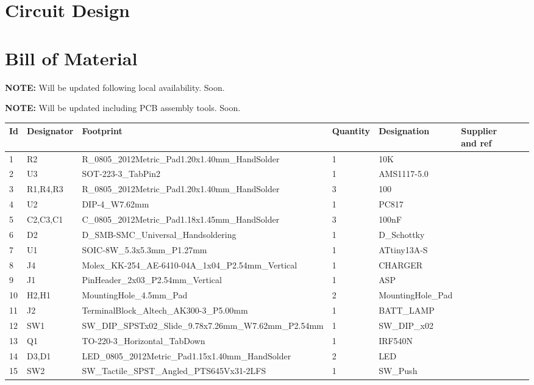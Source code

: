 \documentclass[a4paper,12pt,oneside,pdflatex,italian,final,twocolumn]{article}
\begin{document}
	\section{Circuit Design}
	
	
	
	
	
	\newpage
	\section{Bill of Material}
	
	\textbf{NOTE:} Will be updated following local availability. Soon.
	
	\textbf{NOTE:} Will be updated including PCB assembly tools. Soon.
	
	\begin{table}[!ht]
		\centering
		\begin{tabular}{|l|l|l|l|l|l|l|l|}
			\hline
			Id & Designator & Footprint & Quantity & Designation & Supplier and ref & ~ & ~ \\ \hline
			1 & R2 & R\_0805\_2012Metric\_Pad1.20x1.40mm\_HandSolder & 1 & 10K & ~ & ~ & ~ \\ \hline
			2 & U3 & SOT-223-3\_TabPin2 & 1 & AMS1117-5.0 & ~ & ~ & ~ \\ \hline
			3 & R1,R4,R3 & R\_0805\_2012Metric\_Pad1.20x1.40mm\_HandSolder & 3 & 100 & ~ & ~ & ~ \\ \hline
			4 & U2 & DIP-4\_W7.62mm & 1 & PC817 & ~ & ~ & ~ \\ \hline
			5 & C2,C3,C1 & C\_0805\_2012Metric\_Pad1.18x1.45mm\_HandSolder & 3 & 100nF & ~ & ~ & ~ \\ \hline
			6 & D2 & D\_SMB-SMC\_Universal\_Handsoldering & 1 & D\_Schottky & ~ & ~ & ~ \\ \hline
			7 & U1 & SOIC-8W\_5.3x5.3mm\_P1.27mm & 1 & ATtiny13A-S & ~ & ~ & ~ \\ \hline
			8 & J4 & Molex\_KK-254\_AE-6410-04A\_1x04\_P2.54mm\_Vertical & 1 & CHARGER & ~ & ~ & ~ \\ \hline
			9 & J1 & PinHeader\_2x03\_P2.54mm\_Vertical & 1 & ASP & ~ & ~ & ~ \\ \hline
			10 & H2,H1 & MountingHole\_4.5mm\_Pad & 2 & MountingHole\_Pad & ~ & ~ & ~ \\ \hline
			11 & J2 & TerminalBlock\_Altech\_AK300-3\_P5.00mm & 1 & BATT\_LAMP & ~ & ~ & ~ \\ \hline
			12 & SW1 & SW\_DIP\_SPSTx02\_Slide\_9.78x7.26mm\_W7.62mm\_P2.54mm & 1 & SW\_DIP\_x02 & ~ & ~ & ~ \\ \hline
			13 & Q1 & TO-220-3\_Horizontal\_TabDown & 1 & IRF540N & ~ & ~ & ~ \\ \hline
			14 & D3,D1 & LED\_0805\_2012Metric\_Pad1.15x1.40mm\_HandSolder & 2 & LED & ~ & ~ & ~ \\ \hline
			15 & SW2 & SW\_Tactile\_SPST\_Angled\_PTS645Vx31-2LFS & 1 & SW\_Push & ~ & ~ & ~ \\ \hline
		\end{tabular}
	\end{table}
	
\end{document}
